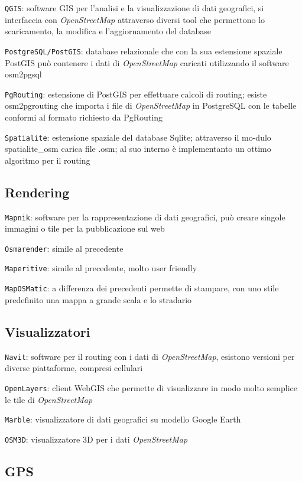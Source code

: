 \documentclass[a4paper,twoside,12pt,]{article}
\newcommand{\osm}{\emph{OpenStreetMap}\xspace}
\newcommand{\soft}[1]{\texttt{#1}}
\begin{document}
\soft{QGIS}: software GIS per l'analisi e la visualizzazione di dati geografici, si interfaccia con \osm attraverso diversi tool che permettono lo scaricamento, la modifica e l'aggiornamento del database

\soft{PostgreSQL/PostGIS}: database relazionale che con la sua estensione spaziale PostGIS può contenere i dati di \osm caricati utilizzando il software osm2pgsql

\soft{PgRouting}: estensione di PostGIS per effettuare calcoli di routing; esiste osm2pgrouting che importa i file di \osm in PostgreSQL con le tabelle conformi al formato richiesto da PgRouting

\soft{Spatialite}: estensione spaziale del database Sqlite; attraverso il mo-dulo spatialite\_osm carica file .osm; al suo interno è implementanto un ottimo algoritmo per il routing 

\subsection{Rendering}

\soft{Mapnik}: software per la rappresentazione di dati geografici, può creare singole immagini o tile per la pubblicazione sul web

\soft{Osmarender}: simile al precedente

\soft{Maperitive}: simile al precedente, molto user friendly

\soft{MapOSMatic}: a differenza dei precedenti permette di stampare, con uno stile predefinito una mappa a grande scala e lo stradario

\subsection{Visualizzatori}

\soft{Navit}: software per il routing con i dati di \osm, esistono versioni per diverse piattaforme, compresi cellulari

\soft{OpenLayers}: client WebGIS che permette di visualizzare in modo molto semplice le tile di \osm

\soft{Marble}: visualizzatore di dati geografici su modello Google Earth

\soft{OSM3D}: visualizzatore 3D per i dati \osm

\subsection{GPS}
\end{document}
